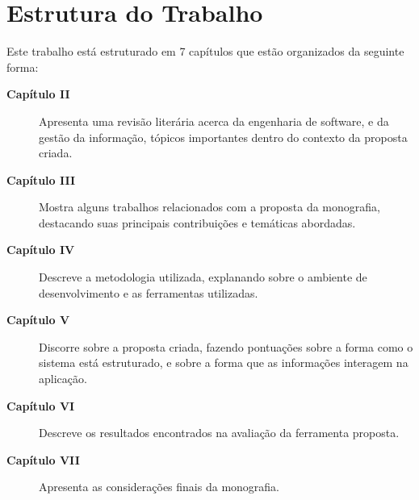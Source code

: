 \section{Estrutura do Trabalho}

Este trabalho está estruturado em 7 capítulos que estão organizados da seguinte forma:

\begin{description}
    \item[\textbf{Capítulo II}] Apresenta uma revisão literária acerca da engenharia de software, e da gestão da informação, tópicos importantes dentro do contexto da proposta criada.
    \item[\textbf{Capítulo III}] Mostra alguns trabalhos relacionados com a proposta da monografia, destacando suas principais contribuições e temáticas abordadas.
    \item[\textbf{Capítulo IV}] Descreve a metodologia utilizada, explanando sobre o ambiente de desenvolvimento e as ferramentas utilizadas.
    \item[\textbf{Capítulo V}] Discorre sobre a proposta criada, fazendo pontuações sobre a forma como o sistema está estruturado, e sobre a forma que as informações interagem na aplicação.
    \item[\textbf{Capítulo VI}] Descreve os resultados encontrados na avaliação da ferramenta proposta.
    \item[\textbf{Capítulo VII}] Apresenta as considerações finais da monografia.
\end{description}
